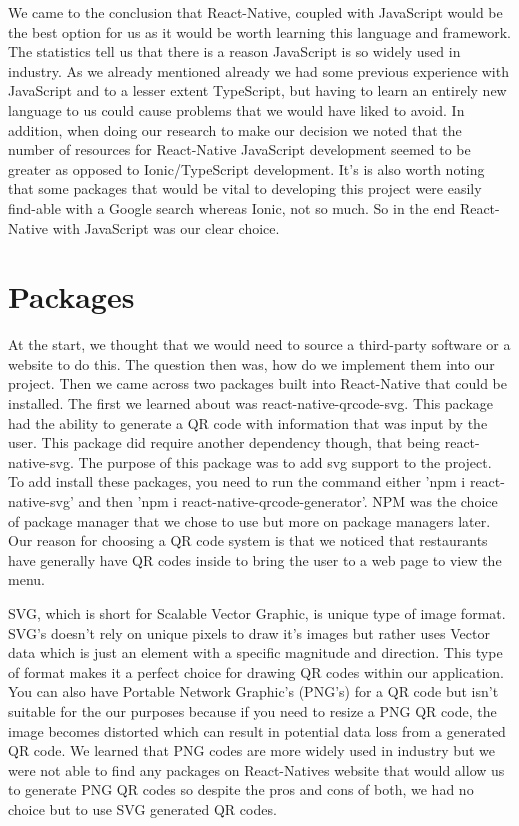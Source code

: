 We came to the conclusion that React-Native, coupled with JavaScript would be the best option for us as it would be worth learning this language and framework. The statistics tell us that there is a reason JavaScript is so widely used in industry. As we already mentioned already we had some previous experience with JavaScript and to a lesser extent TypeScript, but having to learn an entirely new language to us could cause problems that we would have liked to avoid. In addition, when doing our research to make our decision we noted that the number of resources for React-Native JavaScript development seemed to be greater as opposed to Ionic/TypeScript development. It's is also worth noting that some packages that would be vital to developing this project were easily find-able with a Google search whereas Ionic, not so much. So in the end React-Native with JavaScript was our clear choice. 
\section{Packages}
At the start, we thought that we would need to source a third-party software or a website to do this. The question then was, how do we implement them into our project. Then we came across two packages built into React-Native that could be installed. The first we learned about was react-native-qrcode-svg. This package had the ability to generate a QR code with information that was input by the user\cite{npmQrSvg}. This package did require another dependency though, that being react-native-svg. The purpose of this package was to add svg support to the project\cite{npmSvg}. To add install these packages, you need to run the command either 'npm i react-native-svg' and then 'npm i react-native-qrcode-generator'. NPM was the choice of package manager that we chose to use but more on package managers later. Our reason for choosing a QR code system is that we noticed that restaurants have generally have QR codes inside to bring the user to a web page to view the menu. 

SVG, which is short for Scalable Vector Graphic\cite{cagle2008svg}, is unique type of image format. SVG's doesn't rely on unique pixels to draw it's images but rather uses Vector data which is just an element with a specific magnitude and direction\cite{cagle2008svg}. This type of format makes it a perfect choice for drawing QR codes within our application. You can also have Portable Network Graphic's (PNG's) for a QR code but isn't suitable for the our purposes because if you need to resize a PNG QR code, the image becomes distorted which can result in potential data loss from a generated QR code. We learned that PNG codes are more widely used in industry but we were not able to find any packages on React-Natives website that would allow us to generate PNG QR codes so despite the pros and cons of both, we had no choice but to use SVG generated QR codes. 

